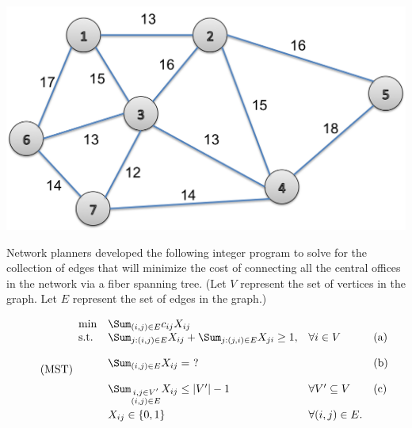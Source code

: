 \begin{center}
\includegraphics[width = .5\textwidth]{uswest_network}
\end{center}

Network planners developed the following integer program to solve for the collection of edges that will minimize the cost of connecting all the central offices in the network via a fiber spanning tree.  (Let $V$ represent the set of vertices in the graph.  Let $E$ represent the set of edges in the graph.)

\begin{equation}
  \label{eq:mst}
  \tag{MST}
  \begin{array}{llll}
    \min & \Sum_{(i,j)\in E} c_{ij} X_{ij} & & \\
    \mbox{s.t.} & \Sum_{j:(i,j) \in E} X_{ij} + 
    \Sum_{j:(j,i) \in E} X_{ji} \geq 1, & \forall i \in V &
    \mbox{(a)} \\[4mm]
    & \Sum_{(i,j) \in E} X_{ij} = ~? & & \mbox{(b)} \\[4mm]
    & \Sum_{\substack{i,j \in V' \\ (i,j) \in E}} X_{ij} \leq |V'| - 1 & \forall V' \subseteq V & \mbox{(c)} \\[4mm]
    & X_{ij} \in \{0,1\} & \forall (i,j) \in E. &
  \end{array}
\end{equation}



